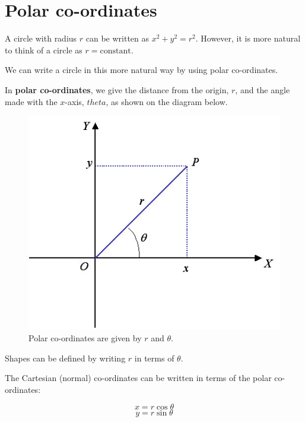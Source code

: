 \section{Polar co-ordinates}
A circle with radius $r$ can be written as $x^2+y^2=r^2$. However, it is more natural to think of a circle as $r=\text{constant}$.

We can write a circle in this more natural way by using polar co-ordinates.

\begin{definition}
In \textbf{polar co-ordinates}, we give the distance from the origin, $r$, and the angle made with the $x$-axis, $theta$, as shown on the
diagram below.

\begin{figure}[H]
    \includegraphics[scale=0.5]{img/polar_def.jpg}
    \centering
  \caption{Polar co-ordinates are given by $r$ and $\theta$.}
\end{figure}

Shapes can be defined by writing $r$ in terms of $\theta$.
\end{definition}

The Cartesian (normal) co-ordinates can be written in terms of the polar co-ordinates:

\begin{in_a_box}
$$x=r\cos\theta$$
$$y=r\sin\theta$$
\end{in_a_box}


